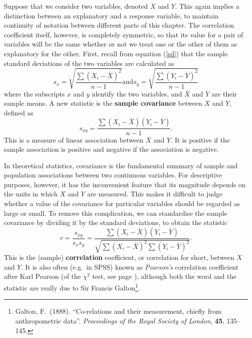 Suppose that we consider two variables, denoted $X$ and $Y$. This again
implies a distinction between an explanatory and a response variable, to
maintain continuity of notation between different parts of this chapter.
The correlation coefficient itself, however, is completely symmetric, so
that its value for a pair of variables will be the same whether or not
we treat one or the other of them as explanatory for the other.
First, recall from equation (\ref{sd}) that the sample standard
deviations of the two variables are calculated as
\begin{equation}
s_{x} = \sqrt{\frac{\sum(X_{i}-\bar{X})^{2}}{n-1}}
\text{and}
s_{y} = \sqrt{\frac{\sum (Y_{i}-\bar{Y})^{2}}{n-1}}
\label{sdyx}
\end{equation}
where the subscripts $x$ and $y$ identify the two variables, and
$\bar{X}$ and $\bar{Y}$ are their sample means. A new statistic
is the
\textbf{sample covariance} between $X$ and $Y$, defined as
\begin{equation}
s_{xy} = \frac{\sum (X_{i}-\bar{X})(Y_{i}-\bar{Y})}{n-1}.
\label{sxy}
\end{equation}
This is a measure of linear association between $X$ and $Y$. It is
positive if the sample association is positive and negative if the
association is negative.

In theoretical statistics, covariance is the fundamental summary of
sample and population associations between two continuous variables. For
descriptive purposes, however, it has the inconvenient feature that its
magnitude depends on the units in which $X$ and $Y$ are measured. This
makes it difficult to judge whether a value of the covariance
for particular variables should be regarded as large or small. To remove
this complication, we can standardise the sample covariance by dividing
it by the standard deviations, to obtain the statistic
\begin{equation}
r=\frac{s_{xy}}{s_{x}s_{y}} =
\frac
{
\sum (X_{i}-\bar{X})(Y_{i}-\bar{Y})
}{
\sqrt{
\sum\left(X_{i}-\bar{X}\right)^{2}
\sum\left(Y_{i}-\bar{Y}\right)^{2}}
}.
\label{corr}
\end{equation}
This is the (sample) \textbf{correlation} coefficient, or correlation
for short, between $X$ and $Y$. It is also often (e.g.\ in SPSS) known as
\emph{Pearson's} correlation coefficient after Karl Pearson (of the
$\chi^{2}$ test, see page \pageref{p_pearson}), although both the word and the statistic
are really due to Sir Francis Galton\footnote{ Galton, F.\ (1888).
``Co-relations and their measurement, chiefly from anthropometric
data''. \emph{Proceedings of the Royal Society of London}, \textbf{45},
135--145.}.

